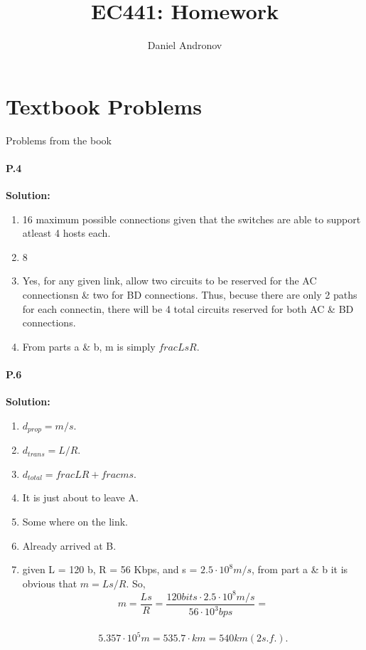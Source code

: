\documentclass[12pt]{article}
\title{EC441: Homework \hwNum{}}
\author{Daniel Andronov}
\date{\displaydate{date}}
\begin{document}
\maketitle
\newpage

\section{Textbook Problems}
Problems from the book

\paragraph{P.4\\}
\textbf{Solution:}
\begin{enumerate}[label= \alph*)]
\item 16 maximum possible connections given that the switches are able to support atleast 4 hosts each.
\item 8
\item Yes, for any given link, allow two circuits to be reserved for the AC connectionsn \& two for BD connections. Thus, becuse there are only 2 paths for each connectin, there will be 4 total circuits reserved for both AC \& BD connections.
\item From parts a \& b, m is simply $frac{Ls}{R}$.
\end{enumerate}                          

                                                                                                                                                                                                                                   
\paragraph{P.6\\}                                                                                                                                                      
\textbf{Solution:}
\begin{enumerate}[label = \alph*)]
\item $d_{prop} = m/s.$
\item $d_{trans} = L/R.$
\item $d_{total} = frac{L}{R} + frac{m}{s}.$
\item It is just about to leave A.
\item Some where on the link.
\item Already arrived at B.
\item given L = 120 b, R = 56 Kbps, and s = $2.5\cdot10^8 m/s$, from part a \& b it is obvious that $m = Ls/R$. So,\\
$$m = \frac{Ls}{R} = \frac{120 bits\cdot2.5\cdot10^8 m/s}{56\cdot10^3 bps}= $$\\
$$5.357\cdot10^5 m = 535.7\cdot km = 540 km (2 s.f.).$$
\end{enumerate}                
\end{document}
